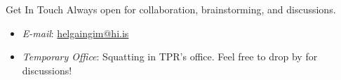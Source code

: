 \documentclass[
    NAME={Dr. Helga Ingimundardóttir},
    EMAIL={helgaingim@hi.is},
    FACULTY={Industrial Engineering},
    SUBTITLE={From Smart Algorithms in Fish Portioning to Pioneering Pipelines in Long-Range DNA Sequencing and Digital Travel},
    SEMINAR={IVT Faculty Gathering},
    DATE={September 6, 2023}
]{hi-latex/hi-beamer}
\begin{document}
\begin{frame}{Get In Touch}
Always open for collaboration, brainstorming, and discussions.

\bigskip

\begin{itemize}
        \item \emph{E-mail}: \href{mailto:helgaingim@hi.is}{helgaingim@hi.is}
        \item \emph{Temporary Office}: Squatting in TPR's office. Feel free to drop by for discussions!
    \end{itemize}
\end{frame}
\end{document}
